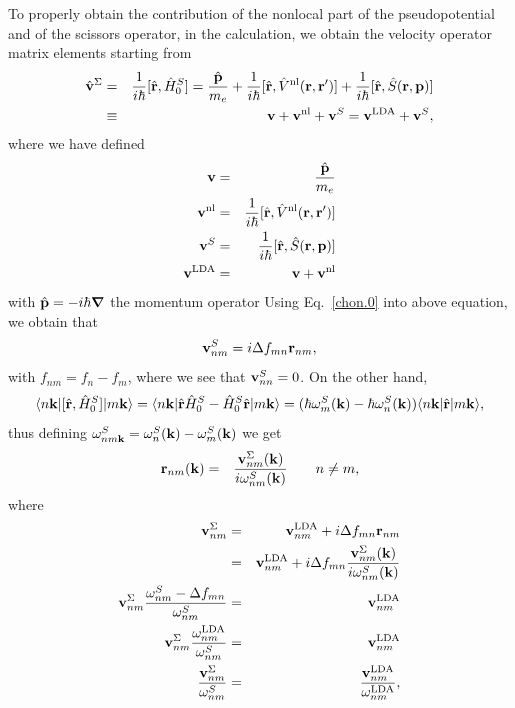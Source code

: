 \documentclass{article}
\begin{document}
To properly obtain the contribution of the nonlocal part of the
pseudopotential and of the scissors operator, 
in the calculation, we obtain
the velocity operator matrix elements starting from
\begin{eqnarray}\label{vop}
\hat{\mathbf{v}}^\Sigma&=&
\frac{1}{i\hbar}[\hat{\mathbf{r}},\hat{H}^S_0]
=\frac{\hat{\mathbf{p}}}{m_e}
+
\frac{1}{i\hbar}[\hat{\mathbf{r}},\hat V^{\mathrm{nl}}(\mathbf{r},\mathbf{r}')]
+
\frac{1}{i\hbar}[\hat{\mathbf{r}},\hat S(\mathbf{r},\mathbf{p})]
\nonumber\\
&\equiv&
\mathbf{v}
+
\mathbf{v}^{\mathrm{nl}}
+\mathbf{v}^S
=
\mathbf{v}^{\mathrm{LDA}}
+\mathbf{v}^S
,
\end{eqnarray}
where we have defined
\begin{eqnarray}\label{conhr}
\mathbf{v}
&=&\frac{\hat{\mathbf{p}}}{m_e}
\nonumber\\
\mathbf{v}^{\mathrm{nl}}
&=&
\frac{1}{i\hbar}[\hat{\mathbf{r}},\hat V^{\mathrm{nl}}(\mathbf{r},\mathbf{r}')]
\nonumber\\
\mathbf{v}^S
&=&
\frac{1}{i\hbar}[\hat{\mathbf{r}},\hat S(\mathbf{r},\mathbf{p})]
\nonumber\\
\mathbf{v}^{\mathrm{LDA}}
&=&
\mathbf{v}
+\mathbf{v}^{\mathrm{nl}}
\end{eqnarray}  
with $\hat{\mathbf{p}}=-i\hbar\boldsymbol{\nabla}$ the momentum operator
Using Eq.~\eqref{chon.0} into above equation, we obtain that
\begin{equation}\label{chon.2} 
\mathbf{v}^S_{nm}=i\Delta f_{mn}\mathbf{r}_{nm},
\end{equation}
with $f_{nm}=f_n-f_m$,
where we see that $\mathbf{v}^S_{nn}=0$.
On the other hand,
\begin{equation}\label{conhrnm}
\langle n\mathbf{k} |
[\hat{\mathbf{r}},\hat{H}^S_0]
| m\mathbf{k} \rangle=\langle n\mathbf{k} |\hat{\mathbf{r}}\hat{H}^S_0-\hat{H}^S_0\hat{\mathbf{r}}| m\mathbf{k} \rangle
=(\hbar\omega^S_m(\mathbf{k})-\hbar\omega^S_n(\mathbf{k}))\langle n\mathbf{k} |\hat{\mathbf{r}}| m\mathbf{k} \rangle
,
\end{equation}
thus defining $\omega^S_{nm\mathbf{k}}=\omega^S_n(\mathbf{k})-\omega^S_m(\mathbf{k})$ we get
\begin{eqnarray}\label{pmnrmn}
\mathbf{r}_{nm}(\mathbf{k})
&=&
\frac{\mathbf{v}^\Sigma_{nm}(\mathbf{k})}{i\omega^S_{nm}(\mathbf{k})}
\quad\quad n\ne m
,
\end{eqnarray} 
where
\begin{eqnarray}\label{chon.8}
\mathbf{v}^\Sigma_{nm}
&=&
\mathbf{v}^{\mathrm{LDA}}_{nm}+i\Delta f_{mn}\mathbf{r}_{nm}
\nonumber\\
&=&
\mathbf{v}^{\mathrm{LDA}}_{nm}+i\Delta f_{mn}\frac{\mathbf{v}^\Sigma_{nm}(\mathbf{k})}{i\omega^S_{nm}(\mathbf{k})}
\nonumber\\
\mathbf{v}^\Sigma_{nm}
\frac{\omega^S_{nm}-\Delta f_{mn}}{\omega^S_{nm}}
&=&
\mathbf{v}^{\mathrm{LDA}}_{nm}
\nonumber\\
\mathbf{v}^\Sigma_{nm}
\frac{\omega^{\mathrm{LDA}}_{nm}}{\omega^S_{nm}}
&=&
\mathbf{v}^{\mathrm{LDA}}_{nm}
\nonumber\\
\frac{\mathbf{v}^\Sigma_{nm}}{\omega^S_{nm}}
&=&
\frac{\mathbf{v}^{\mathrm{LDA}}_{nm}}{\omega^{\mathrm{LDA}}_{nm}}
,
\end{eqnarray}
\end{document}
